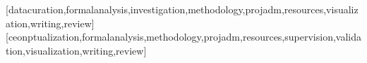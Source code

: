 \documentclass[portuguese]{textolivre}
\begin{document}






\printbibliography\label{sec-bib}
\begin{contributors}
[datacuration,formalanalysis,investigation,methodology,projadm,resources,visualization,writing,review]
[ceonptualization,formalanalysis,methodology,projadm,resources,supervision,validation,visualization,writing,review]
\end{contributors}
\end{document}
